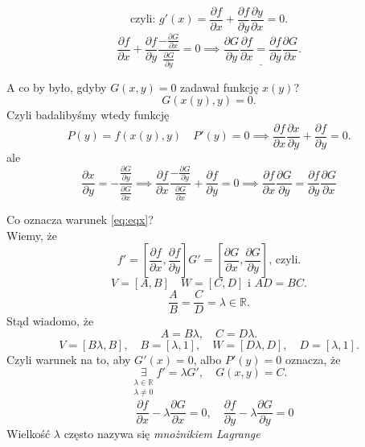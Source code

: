 \documentclass[../main.tex]{subfiles}
\begin{document}
    \[
        \text{czyli: } g'(x) = \frac{\partial f}{\partial x} + \frac{\partial f}{\partial y} \frac{\partial y}{\partial x} = 0
    .\]
    \[
        \frac{\partial f}{\partial x} + \frac{\partial f}{\partial y} \frac{-\frac{\partial G}{\partial x}}{\frac{\partial G}{\partial y} } = 0
        \implies \underline{\frac{\partial G}{\partial y} \frac{\partial f}{\partial x} = \frac{\partial f}{\partial y} \frac{\partial G}{\partial x}}
    .\]

    A co by było, gdyby $G(x,y) = 0$ zadawał funkcję $x(y)$?\\
    \[
        G(x(y),y) = 0
    .\]
    Czyli badalibyśmy wtedy funkcję \[
        P(y) = f(x(y),y)\quad P'(y) = 0 \implies \frac{\partial f}{\partial x} \frac{\partial x}{\partial y} + \frac{\partial f}{\partial y}  = 0
    .\]
    ale
    \begin{equation}\label{eq:eqx}
        \frac{\partial x}{\partial y}  = - \frac{\frac{\partial G}{\partial y}}{\frac{\partial G}{\partial x}} \implies \frac{\partial f}{\partial x} \frac{-\frac{\partial G}{\partial y} }{\frac{\partial G}{\partial x} }+\frac{\partial f}{\partial y} = 0 \implies \frac{\partial f}{\partial x} \frac{\partial G}{\partial y} = \frac{\partial f}{\partial y} \frac{\partial G}{\partial x}
    \end{equation}

    Co oznacza warunek \ref{eq:eqx}?\\
    Wiemy, że
    \[
        f' = \left[ \frac{\partial f}{\partial x} , \frac{\partial f}{\partial y}  \right] G' = \left[ \frac{\partial G}{\partial x} , \frac{\partial G}{\partial y}  \right]\text{, czyli}
    .\]
    \[
        V = \left[ A,B \right] \quad W = \left[ C,D \right] \text{ i } AD = BC
    .\]
    \[
    \frac{A}{B} = \frac{C}{D} = \lambda\in \mathbb{R}
    .\]
    Stąd wiadomo, że \[
    A = B\lambda, \quad C = D\lambda
    .\]
    \[
        V = \left[ B\lambda, B \right] ,\quad B = \left[ \lambda, 1 \right], \quad W = \left[ D\lambda, D \right], \quad D = \left[ \lambda, 1 \right]
    .\]
    Czyli warunek na to,  aby $G'(x) = 0$, albo  $P'(y) = 0$ oznacza, że \[
        \underset{\substack{\lambda\in\mathbb{R}\\ \lambda\neq 0}}{\exists} f' = \lambda G',  \quad G(x,y) = C
    .\]
    \begin{equation}\label{eq:eqy}
    \quad \frac{\partial f}{\partial x} - \lambda \frac{\partial G}{\partial x} = 0, \quad \frac{\partial f}{\partial y} - \lambda \frac{\partial G}{\partial y} = 0
    \end{equation}
    Wielkość $\lambda$ często nazywa się \textit{mnożnikiem Lagrange}
\end{document}
